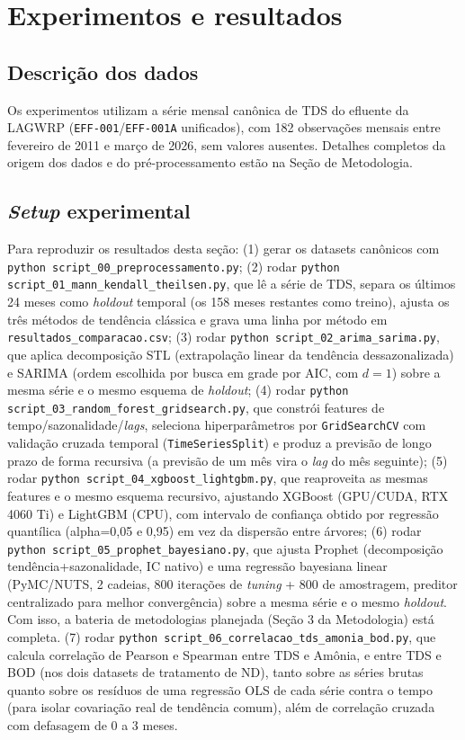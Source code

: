 \section{Experimentos e resultados}

\subsection{Descrição dos dados}

Os experimentos utilizam a série mensal canônica de TDS do efluente da LAGWRP (\texttt{EFF-001}/\texttt{EFF-001A} unificados), com 182 observações mensais entre fevereiro de 2011 e março de 2026, sem valores ausentes. Detalhes completos da origem dos dados e do pré-processamento estão na Seção de Metodologia.

\subsection{\textit{Setup} experimental}

Para reproduzir os resultados desta seção: (1) gerar os datasets canônicos com \texttt{python script\_00\_preprocessamento.py}; (2) rodar \texttt{python script\_01\_mann\_kendall\_theilsen.py}, que lê a série de TDS, separa os últimos 24 meses como \textit{holdout} temporal (os 158 meses restantes como treino), ajusta os três métodos de tendência clássica e grava uma linha por método em \texttt{resultados\_comparacao.csv}; (3) rodar \texttt{python script\_02\_arima\_sarima.py}, que aplica decomposição STL (extrapolação linear da tendência dessazonalizada) e SARIMA (ordem escolhida por busca em grade por AIC, com $d=1$) sobre a mesma série e o mesmo esquema de \textit{holdout}; (4) rodar \texttt{python script\_03\_random\_forest\_gridsearch.py}, que constrói features de tempo/sazonalidade/\textit{lags}, seleciona hiperparâmetros por \texttt{GridSearchCV} com validação cruzada temporal (\texttt{TimeSeriesSplit}) e produz a previsão de longo prazo de forma recursiva (a previsão de um mês vira o \textit{lag} do mês seguinte); (5) rodar \texttt{python script\_04\_xgboost\_lightgbm.py}, que reaproveita as mesmas features e o mesmo esquema recursivo, ajustando XGBoost (GPU/CUDA, RTX 4060 Ti) e LightGBM (CPU), com intervalo de confiança obtido por regressão quantílica (alpha=0,05 e 0,95) em vez da dispersão entre árvores; (6) rodar \texttt{python script\_05\_prophet\_bayesiano.py}, que ajusta Prophet (decomposição tendência+sazonalidade, IC nativo) e uma regressão bayesiana linear (PyMC/NUTS, 2 cadeias, 800 iterações de \textit{tuning} + 800 de amostragem, preditor centralizado para melhor convergência) sobre a mesma série e o mesmo \textit{holdout}. Com isso, a bateria de metodologias planejada (Seção 3 da Metodologia) está completa. (7) rodar \texttt{python script\_06\_correlacao\_tds\_amonia\_bod.py}, que calcula correlação de Pearson e Spearman entre TDS e Amônia, e entre TDS e BOD (nos dois datasets de tratamento de ND), tanto sobre as séries brutas quanto sobre os resíduos de uma regressão OLS de cada série contra o tempo (para isolar covariação real de tendência comum), além de correlação cruzada com defasagem de 0 a 3 meses.

